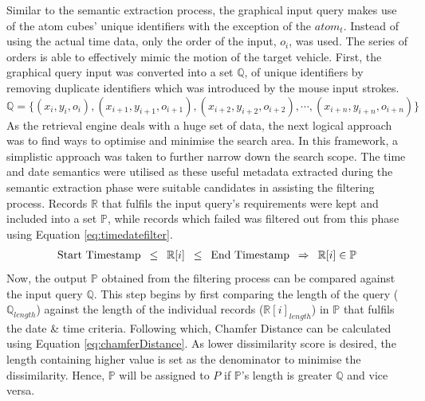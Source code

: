 Similar to the semantic extraction process, the graphical input query makes use
of the atom cubes' unique identifiers with the exception of the $atom_t$. 
Instead of using the actual time data, only the order of the input, $o_{i}$, was used.
The series of orders is able to effectively mimic the motion of the target
vehicle. First, the graphical query input was converted into a set
$\mathbb{Q}$, of unique identifiers by removing duplicate identifiers which
was introduced by the mouse input strokes.
\begin{equation}
    \mathbb{Q} = \{ (x_i, y_i, o_i), (x_{i+1}, y_{i+1}, o_{i+1}), (x_{i+2}, y_{i+2}, o_{i+2}), \dotsb,(x_{i+n}, y_{i+n}, o_{i+n})\}
\end{equation}
As the retrieval engine deals with a huge set of data, the next logical
approach was to find ways to optimise and minimise the search area. In this
framework, a simplistic approach was taken to further narrow down the search
scope.
The time and date semantics were utilised as these useful metadata extracted
during the semantic extraction phase were suitable candidates in assisting the
filtering process.
Records $\mathbb{R}$ that fulfils the input query's requirements were kept and
included into a set $\mathbb{P}$, while records which failed was filtered out
from this phase using Equation \ref{eq:timedatefilter}.
\begin{gather}
\label{eq:timedatefilter}
  \text{Start Timestamp} \hspace{.5em} \leq \hspace{.5em} \mathbb{R}[i] \hspace{.5em} \leq \hspace{.5em} \text{End Timestamp} \hspace{.5em} \Rightarrow \hspace{.5em} \mathbb{R}[i] \in \mathbb{P}
\end{gather}
Now, the output $\mathbb{P}$ obtained from the filtering process can be
compared against the input query $\mathbb{Q}$. This step begins by first
comparing the length of the query ($\mathbb{Q}_{length}$) against the length
of the individual records ($\mathbb{R}[i]_{length}$) in $\mathbb{P}$ that
fulfils the date \& time criteria.
Following which, Chamfer Distance can be calculated using Equation
\ref{eq:chamferDistance}. As lower dissimilarity score is desired, the length
containing higher value is set as the denominator to minimise the dissimilarity.
Hence, $\mathbb{P}$ will be assigned to $P$ if $\mathbb{P}$'s length is greater
$\mathbb{Q}$ and vice versa.

